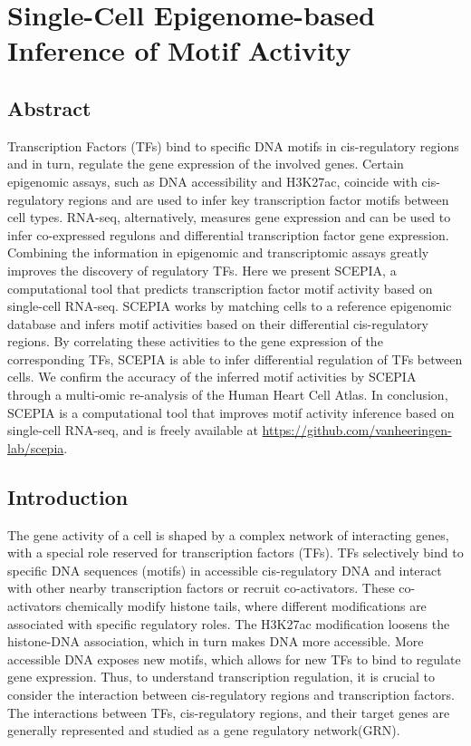 \chapter{Single-Cell Epigenome-based Inference of Motif Activity}\thumbforchapter
{}
\newpage

\section{Abstract}

Transcription Factors (TFs) bind to specific DNA motifs in cis-regulatory regions and in turn, regulate the gene expression of the involved genes. Certain epigenomic assays, such as DNA accessibility and H3K27ac, coincide with cis-regulatory regions and are used to infer key transcription factor motifs between cell types. RNA-seq, alternatively, measures gene expression and can be used to infer co-expressed regulons and differential transcription factor gene expression. Combining the information in epigenomic and transcriptomic assays greatly improves the discovery of regulatory TFs. Here we present SCEPIA, a computational tool that predicts transcription factor motif activity based on single-cell RNA-seq. SCEPIA works by matching cells to a reference epigenomic database and infers motif activities based on their differential cis-regulatory regions. By correlating these activities to the gene expression of the corresponding TFs, SCEPIA is able to infer differential regulation of TFs between cells. We confirm the accuracy of the inferred motif activities by SCEPIA through a multi-omic re-analysis of the Human Heart Cell Atlas. In conclusion, SCEPIA is a computational tool that improves motif activity inference based on single-cell RNA-seq, and is freely available at \url{https://github.com/vanheeringen-lab/scepia}.

\section{Introduction}

The gene activity of a cell is shaped by a complex network of interacting genes, with a special role reserved for transcription factors (TFs). TFs selectively bind to specific DNA sequences (motifs) in accessible cis-regulatory DNA and interact with other nearby transcription factors or recruit co-activators\cite{Spitz2012}. These co-activators chemically modify histone tails, where different modifications are associated with specific regulatory roles. The H3K27ac modification loosens the histone-DNA association, which in turn makes DNA more accessible\cite{Creyghton2010}. More accessible DNA exposes new motifs, which allows for new TFs to bind to regulate gene expression\cite{Tsompana2014}. Thus, to understand transcription regulation, it is crucial to consider the interaction between cis-regulatory regions and transcription factors\cite{Xu_2020,Kamal_2021,Gonz_lez_Blas_2022,Fleck2022,Kamimoto2023,Kartha2022}. The interactions between TFs, cis-regulatory regions, and their target genes are generally represented and studied as a gene regulatory network(GRN).

